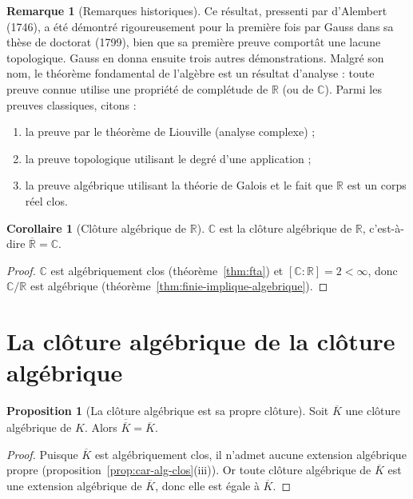 \documentclass[12pt,a4paper,openany]{book}
\theoremstyle{definition}
\newtheorem{proposition}{Proposition}[chapter]
\newtheorem{corollaire}{Corollaire}[chapter]
\newtheorem{remarque}{Remarque}[chapter]
\newcommand{\R}{\mathbb{R}}
\newcommand{\C}{\mathbb{C}}
\begin{document}
\begin{remarque}[Remarques historiques]
\label{rem:fta-histoire}
Ce résultat, pressenti par d'Alembert (1746), a été démontré rigoureusement pour
la première fois par Gauss dans sa thèse de doctorat (1799), bien que sa première
preuve comportât une lacune topologique. Gauss en donna ensuite trois autres
démonstrations. Malgré son nom, le théorème fondamental de l'algèbre est un
résultat d'analyse : toute preuve connue utilise une propriété de complétude de
$\R$ (ou de $\C$). Parmi les preuves classiques, citons :
\begin{enumerate}[label=(\alph*)]
  \item la preuve par le théorème de Liouville (analyse complexe) ;
  \item la preuve topologique utilisant le degré d'une application ;
  \item la preuve algébrique utilisant la théorie de Galois et le fait que $\R$
    est un corps réel clos.
\end{enumerate}
\end{remarque}

\begin{corollaire}[Clôture algébrique de $\R$]
\label{cor:cloture-R}
$\C$ est la clôture algébrique de $\R$, c'est-à-dire $\overline{\R} = \C$.
\end{corollaire}

\begin{proof}
$\C$ est algébriquement clos (théorème~\ref{thm:fta}) et $[\C:\R] = 2 < \infty$,
donc $\C/\R$ est algébrique (théorème~\ref{thm:finie-implique-algebrique}).
\end{proof}

\section{La clôture algébrique de la clôture algébrique}
\label{sec:cloture-cloture}

\begin{proposition}[La clôture algébrique est sa propre clôture]
\label{prop:cloture-idempotent}
Soit $\overline{K}$ une clôture algébrique de $K$. Alors
$\overline{\overline{K}} = \overline{K}$.
\end{proposition}

\begin{proof}
Puisque $\overline{K}$ est algébriquement clos, il n'admet aucune extension
algébrique propre (proposition~\ref{prop:car-alg-clos}(iii)). Or toute clôture
algébrique de $\overline{K}$ est une extension algébrique de $\overline{K}$,
donc elle est égale à $\overline{K}$.
\end{proof}
\end{document}
